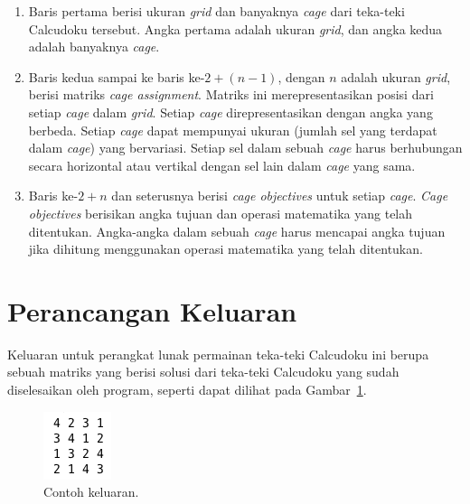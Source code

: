 \begin{enumerate}
\item Baris pertama berisi ukuran \textit{grid} dan banyaknya \textit{cage} dari teka-teki Calcudoku tersebut. Angka pertama adalah ukuran \textit{grid}, dan angka kedua adalah banyaknya \textit{cage}.
\item Baris kedua sampai ke baris ke-\begin{math}2 + (n - 1)\end{math}, dengan \begin{math}n\end{math} adalah ukuran \textit{grid}, berisi matriks \textit{cage assignment}. Matriks ini merepresentasikan posisi dari setiap \textit{cage} dalam \textit{grid}. Setiap \textit{cage} direpresentasikan dengan angka yang berbeda. Setiap \textit{cage} dapat mempunyai ukuran (jumlah sel yang terdapat dalam \textit{cage}) yang bervariasi. Setiap sel dalam sebuah \textit{cage} harus berhubungan secara horizontal atau vertikal dengan sel lain dalam \textit{cage} yang sama.
\item Baris ke-\begin{math}2 + n\end{math} dan seterusnya berisi \textit{cage objectives} untuk setiap \textit{cage}. \textit{Cage objectives} berisikan angka tujuan dan operasi matematika yang telah ditentukan. Angka-angka dalam sebuah \textit{cage} harus mencapai angka tujuan jika dihitung menggunakan operasi matematika yang telah ditentukan.
\end{enumerate}

\section{Perancangan Keluaran}
\label{sec:perancangankeluaran}

Keluaran untuk perangkat lunak permainan teka-teki Calcudoku ini berupa sebuah matriks yang berisi solusi dari teka-teki Calcudoku yang sudah diselesaikan oleh program, seperti dapat dilihat pada Gambar~\ref{fig:perancangankeluaran}.

\begin{figure}
\centering
\captionsetup{justification=centering}
\includegraphics[scale=1]{Gambar/Perancangan/PerancanganOutput.png}
\caption[Contoh keluaran.]{Contoh keluaran.}
\label{fig:perancangankeluaran}
\end{figure}


